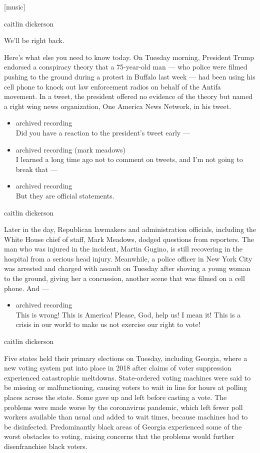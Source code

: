 {[}music{]}

caitlin dickerson

We'll be right back.

Here's what else you need to know today. On Tuesday morning, President
Trump endorsed a conspiracy theory that a 75-year-old man --- who police
were filmed pushing to the ground during a protest in Buffalo last week
--- had been using his cell phone to knock out law enforcement radios on
behalf of the Antifa movement. In a tweet, the president offered no
evidence of the theory but named a right wing news organization, One
America News Network, in his tweet.

\begin{itemize}
\item
  archived recording\\
  Did you have a reaction to the president's tweet early ---
\item
  archived recording (mark meadows)\\
  I learned a long time ago not to comment on tweets, and I'm not going
  to break that ---
\item
  archived recording\\
  But they are official statements.
\end{itemize}

caitlin dickerson

Later in the day, Republican lawmakers and administration officials,
including the White House chief of staff, Mark Meadows, dodged questions
from reporters. The man who was injured in the incident, Martin Gugino,
is still recovering in the hospital from a serious head injury.
Meanwhile, a police officer in New York City was arrested and charged
with assault on Tuesday after shoving a young woman to the ground,
giving her a concussion, another scene that was filmed on a cell phone.
And ---

\begin{itemize}
\tightlist
\item
  archived recording\\
  This is wrong! This is America! Please, God, help us! I mean it! This
  is a crisis in our world to make us not exercise our right to vote!
\end{itemize}

caitlin dickerson

Five states held their primary elections on Tuesday, including Georgia,
where a new voting system put into place in 2018 after claims of voter
suppression experienced catastrophic meltdowns. State-ordered voting
machines were said to be missing or malfunctioning, causing voters to
wait in line for hours at polling places across the state. Some gave up
and left before casting a vote. The problems were made worse by the
coronavirus pandemic, which left fewer poll workers available than usual
and added to wait times, because machines had to be disinfected.
Predominantly black areas of Georgia experienced some of the worst
obstacles to voting, raising concerns that the problems would further
disenfranchise black voters.

